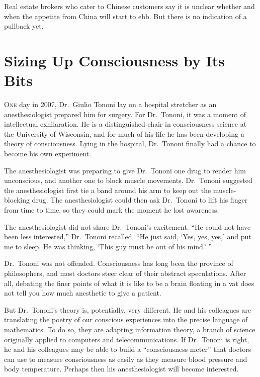 ﻿\documentclass[12pt]{article}
\begin{document}
Real estate brokers who cater to Chinese customers say it is unclear whether and when the appetite
from China will start to ebb. But there is no indication of a pullback yet.

\pagebreak
\section{Sizing Up Consciousness by Its Bits}

\lettrine{O}{ne} day in 2007, Dr.~Giulio Tononi lay on a hospital stretcher
as an anesthesiologist prepared him for surgery. For Dr.~Tononi, it was a moment of intellectual
exhilaration. He is a distinguished chair in consciousness science at the University of Wisconsin,
and for much of his life he has been developing a theory of consciousness. Lying in the hospital,
Dr.~Tononi finally had a chance to become his own experiment.

The anesthesiologist was preparing to give Dr.~Tononi one drug to render him unconscious, and
another one to block muscle movements. Dr.~Tononi suggested the anesthesiologist first tie a band
around his arm to keep out the muscle-blocking drug. The anesthesiologist could then ask Dr.~Tononi
to lift his finger from time to time, so they could mark the moment he lost awareness.

The anesthesiologist did not share Dr.~Tononi's excitement. ``He could not have been less
interested,'' Dr.~Tononi recalled. ``He just said, `Yes, yes, yes,' and put me to sleep. He was
thinking, `This guy must be out of his mind.' ''

Dr.~Tononi was not offended. Consciousness has long been the province of philosophers, and most
doctors steer clear of their abstract speculations. After all, debating the finer points of what it
is like to be a brain floating in a vat does not tell you how much anesthetic to give a patient.

But Dr.~Tononi's theory is, potentially, very different. He and his colleagues are translating the
poetry of our conscious experiences into the precise language of mathematics. To do so, they are
adapting information theory, a branch of science originally applied to computers and
telecommunications. If Dr.~Tononi is right, he and his colleagues may be able to build a
``consciousness meter'' that doctors can use to measure consciousness as easily as they measure
blood pressure and body temperature. Perhaps then his anesthesiologist will become interested.
\end{document}
